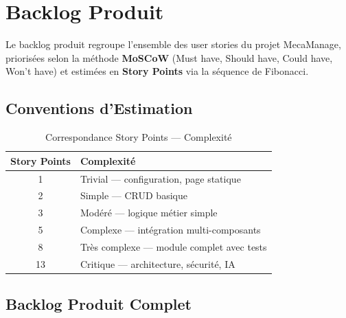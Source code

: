 \documentclass[12pt,a4paper]{report}
\begin{document}
\section{Backlog Produit}

Le backlog produit regroupe l'ensemble des user stories du projet
MecaManage, prioris\'{e}es selon la m\'{e}thode \textbf{MoSCoW}
(Must have, Should have, Could have, Won't have) et estim\'{e}es
en \textbf{Story Points} via la s\'{e}quence de Fibonacci.

\subsection{Conventions d'Estimation}

\begin{table}[H]
\centering
\caption{Correspondance Story Points --- Complexit\'{e}}
\renewcommand{\arraystretch}{1.3}
\begin{tabularx}{\textwidth}{|c|X|}
\hline
\rowcolor{primary!20}
\textbf{Story Points} & \textbf{Complexit\'{e}} \\
\hline
1 & Trivial --- configuration, page statique \\
\hline
2 & Simple --- CRUD basique \\
\hline
3 & Mod\'{e}r\'{e} --- logique m\'{e}tier simple \\
\hline
5 & Complexe --- int\'{e}gration multi-composants \\
\hline
8 & Tr\`{e}s complexe --- module complet avec tests \\
\hline
13 & Critique --- architecture, s\'{e}curit\'{e}, IA \\
\hline
\end{tabularx}
\end{table}

\subsection{Backlog Produit Complet}
\end{document}
